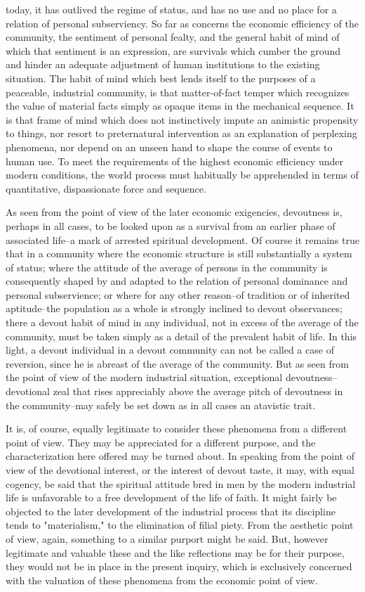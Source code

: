 \documentclass[12pt]{report}
\begin{document}
today, it has outlived the regime of status, and has no use and no place
for a relation of personal subserviency. So far as concerns the economic
efficiency of the community, the sentiment of personal fealty, and the
general habit of mind of which that sentiment is an expression, are
survivals which cumber the ground and hinder an adequate adjustment of
human institutions to the existing situation. The habit of mind which
best lends itself to the purposes of a peaceable, industrial community,
is that matter-of-fact temper which recognizes the value of material
facts simply as opaque items in the mechanical sequence. It is
that frame of mind which does not instinctively impute an animistic
propensity to things, nor resort to preternatural intervention as an
explanation of perplexing phenomena, nor depend on an unseen hand to
shape the course of events to human use. To meet the requirements of the
highest economic efficiency under modern conditions, the world process
must habitually be apprehended in terms of quantitative, dispassionate
force and sequence.

As seen from the point of view of the later economic exigencies,
devoutness is, perhaps in all cases, to be looked upon as a survival
from an earlier phase of associated life--a mark of arrested spiritual
development. Of course it remains true that in a community where the
economic structure is still substantially a system of status; where
the attitude of the average of persons in the community is consequently
shaped by and adapted to the relation of personal dominance and
personal subservience; or where for any other reason--of tradition or
of inherited aptitude--the population as a whole is strongly inclined to
devout observances; there a devout habit of mind in any individual, not
in excess of the average of the community, must be taken simply as
a detail of the prevalent habit of life. In this light, a devout
individual in a devout community can not be called a case of reversion,
since he is abreast of the average of the community. But as seen from
the point of view of the modern industrial situation, exceptional
devoutness--devotional zeal that rises appreciably above the average
pitch of devoutness in the community--may safely be set down as in all
cases an atavistic trait.

It is, of course, equally legitimate to consider these phenomena from
a different point of view. They may be appreciated for a different
purpose, and the characterization here offered may be turned about.
In speaking from the point of view of the devotional interest, or the
interest of devout taste, it may, with equal cogency, be said that
the spiritual attitude bred in men by the modern industrial life is
unfavorable to a free development of the life of faith. It might fairly
be objected to the later development of the industrial process that its
discipline tends to "materialism," to the elimination of filial piety.
From the aesthetic point of view, again, something to a similar purport
might be said. But, however legitimate and valuable these and the like
reflections may be for their purpose, they would not be in place in the
present inquiry, which is exclusively concerned with the valuation of
these phenomena from the economic point of view.
\end{document}
